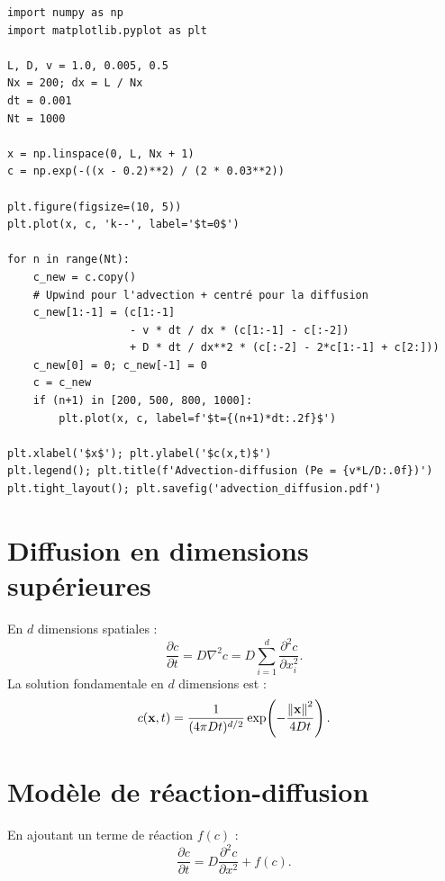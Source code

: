 \begin{codeblock}[title=\textbf{Advection-diffusion}]
\begin{verbatim}
import numpy as np
import matplotlib.pyplot as plt

L, D, v = 1.0, 0.005, 0.5
Nx = 200; dx = L / Nx
dt = 0.001
Nt = 1000

x = np.linspace(0, L, Nx + 1)
c = np.exp(-((x - 0.2)**2) / (2 * 0.03**2))

plt.figure(figsize=(10, 5))
plt.plot(x, c, 'k--', label='$t=0$')

for n in range(Nt):
    c_new = c.copy()
    # Upwind pour l'advection + centré pour la diffusion
    c_new[1:-1] = (c[1:-1]
                   - v * dt / dx * (c[1:-1] - c[:-2])
                   + D * dt / dx**2 * (c[:-2] - 2*c[1:-1] + c[2:]))
    c_new[0] = 0; c_new[-1] = 0
    c = c_new
    if (n+1) in [200, 500, 800, 1000]:
        plt.plot(x, c, label=f'$t={(n+1)*dt:.2f}$')

plt.xlabel('$x$'); plt.ylabel('$c(x,t)$')
plt.legend(); plt.title(f'Advection-diffusion (Pe = {v*L/D:.0f})')
plt.tight_layout(); plt.savefig('advection_diffusion.pdf')
\end{verbatim}
\end{codeblock}

\section{Diffusion en dimensions sup\'erieures}

\begin{definition}
En $d$ dimensions spatiales :
\[
  \frac{\partial c}{\partial t} = D\nabla^2 c
  = D\sum_{i=1}^d \frac{\partial^2 c}{\partial x_i^2}.
\]
La solution fondamentale en $d$ dimensions est :
\[
  c(\mathbf{x},t) = \frac{1}{(4\pi Dt)^{d/2}}
  \exp\!\left(-\frac{\left\| \mathbf{x} \right\|^2}{4Dt}\right).
\]
\end{definition}

\section{Mod\`ele de r\'eaction-diffusion}
\label{sec:reaction_diffusion}

\begin{definition}
En ajoutant un terme de r\'eaction $f(c)$ :
\[
  \frac{\partial c}{\partial t} = D\frac{\partial^2 c}{\partial x^2}
  + f(c).
\]
\end{definition}

